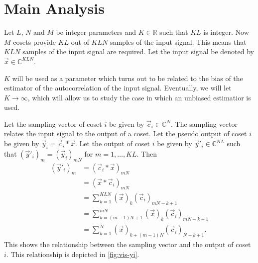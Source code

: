 \documentclass[a4paper, openany, oneside]{memoir}
\begin{document}
\section{Main Analysis}

Let $L$, $N$ and $M$ be integer parameters and $K \in \mathbb{R}$ such that $KL$ is integer. Now $M$ cosets provide $KL$ out of $KLN$ samples of the input signal. This means that $KLN$ samples of the input signal are required. Let the input signal be denoted by $\vec{x} \in \mathbb{C}^{KLN}$.

$K$ will be used as a parameter which turns out to be related to the bias of the estimator of the autocorrelation of the input signal. Eventually, we will let $K \to \infty$, which will allow us to study the case in which an unbiased estimatior is used.

Let the sampling vector of coset $i$ be given by $\vec{c}_i \in \mathbb{C}^{N}$. The sampling vector relates the input signal to the output of a coset. Let the pseudo output of coset $i$ be given by $\vec{y}_i = \vec{c}_i \ast \vec{x}$. Let the output of coset $i$ be given by $\vec{y}'_i \in \mathbb{C}^{KL}$ such that $(\vec{y}'_i)_m=(\vec{y}_i)_{mN}$ for $m=1,\ldots,KL$. Then
\begin{align*}
    (\vec{y}'_i)_m &= (\vec{c}_i \ast \vec{x})_{mN} \\
    &= (\vec{x} \ast \vec{c}_i)_{mN} \\
    &= \sum_{k=1}^{KLN} (\vec{x})_k (\vec{c}_i)_{mN-k+1} \\
    &= \sum_{k=(m-1)N+1}^{mN} (\vec{x})_k (\vec{c}_i)_{mN-k+1} \\
    &= \sum_{k=1}^{N} (\vec{x})_{k+(m-1)N} (\vec{c}_i)_{N-k+1}.
\end{align*}
This shows the relationship between the sampling vector and the output of coset $i$. This relationship is depicted in \cref{fig:vis-yi}.
\end{document}
